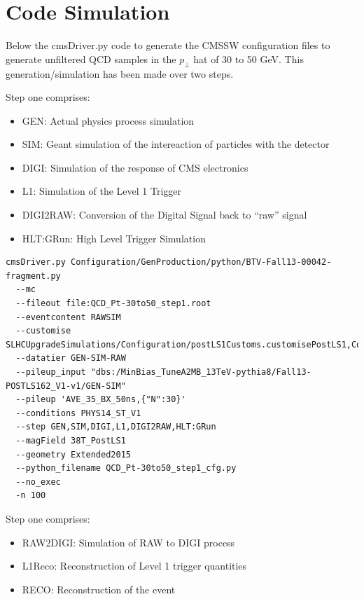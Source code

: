 \documentclass[a4paper]{article}
\begin{document}
\newpage
\section{Code Simulation}

Below the cmsDriver.py code to generate the CMSSW configuration files to generate unfiltered QCD samples in the $p_\perp$ hat of 30 to 50 GeV. This generation/simulation has been made over two steps. 

Step one comprises:
\begin{itemize}
  \item GEN: Actual physics process simulation
  \item SIM: Geant simulation of the intereaction of particles with the detector
  \item DIGI: Simulation of the response of CMS electronics
  \item L1: Simulation of the Level 1 Trigger
  \item DIGI2RAW: Conversion of the Digital Signal back to ``raw'' signal
  \item HLT:GRun: High Level Trigger Simulation
\end{itemize}


\lstset{
  language=bash,
  basicstyle=\footnotesize, 
  breaklines=true
}
\begin{framed}
\begin{lstlisting}
cmsDriver.py Configuration/GenProduction/python/BTV-Fall13-00042-fragment.py 
  --mc 
  --fileout file:QCD_Pt-30to50_step1.root 
  --eventcontent RAWSIM 
  --customise SLHCUpgradeSimulations/Configuration/postLS1Customs.customisePostLS1,Configuration/StandardSequences/SimWithCastor_cff.customise 
  --datatier GEN-SIM-RAW 
  --pileup_input "dbs:/MinBias_TuneA2MB_13TeV-pythia8/Fall13-POSTLS162_V1-v1/GEN-SIM" 
  --pileup 'AVE_35_BX_50ns,{"N":30}' 
  --conditions PHYS14_ST_V1 
  --step GEN,SIM,DIGI,L1,DIGI2RAW,HLT:GRun 
  --magField 38T_PostLS1 
  --geometry Extended2015 
  --python_filename QCD_Pt-30to50_step1_cfg.py 
  --no_exec 
  -n 100
\end{lstlisting}
\end{framed}

Step one comprises:
\begin{itemize}
  \item RAW2DIGI: Simulation of RAW to DIGI process
  \item L1Reco: Reconstruction of Level 1 trigger quantities
  \item RECO: Reconstruction of the event
\end{itemize}
\end{document}
